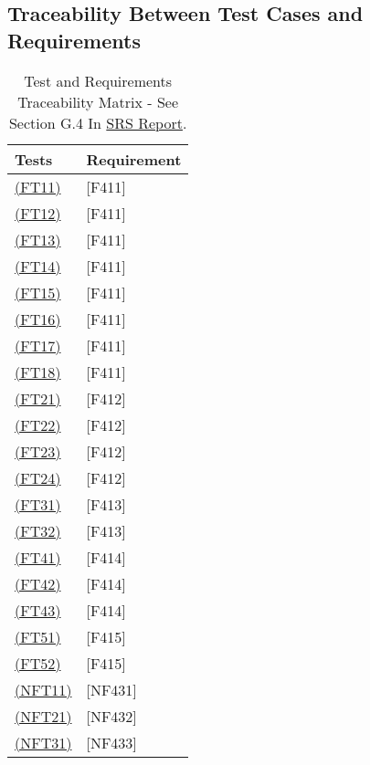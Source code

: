 \documentclass[12pt, titlepage]{article}
\begin{document}
\subsection{Traceability Between Test Cases and Requirements}

\begin{table}[H]
  
  \centering
  \caption{Test and Requirements Traceability Matrix - See Section G.4 In \href{https://github.com/takhtart/PCD/blob/main/docs/SRS/SRS.pdf}{SRS Report}.}
  \begin{tabular}{|l|l|}
  \hline
  Tests   & Requirement \\
  \hline
  \hyperref[FT11]{(FT11)}  & {[}F411{]}  \\
  \hline
  \hyperref[FT12]{(FT12)}  & {[}F411{]}  \\
  \hline
  \hyperref[FT13]{(FT13)}  & {[}F411{]}  \\
  \hline
  \hyperref[FT14]{(FT14)} & {[}F411{]}  \\
  \hline
  \hyperref[FT15]{(FT15)}  & {[}F411{]}  \\
  \hline
  \hyperref[FT16]{(FT16)}  & {[}F411{]}  \\
  \hline
  \hyperref[FT17]{(FT17)}  & {[}F411{]}  \\
  \hline
  \hyperref[FT18]{(FT18)}  & {[}F411{]}  \\
  \hline
  \hyperref[FT21]{(FT21)}  & {[}F412{]}  \\
  \hline
  \hyperref[FT22]{(FT22)}  & {[}F412{]}  \\
  \hline
  \hyperref[FT23]{(FT23)}  & {[}F412{]}  \\
  \hline
  \hyperref[FT24]{(FT24)}  & {[}F412{]}  \\
  \hline
  \hyperref[FT31]{(FT31)}  & {[}F413{]}  \\
  \hline
  \hyperref[FT32]{(FT32)}  & {[}F413{]}  \\
  \hline
  \hyperref[FT41]{(FT41)}  & {[}F414{]}  \\
  \hline
  \hyperref[FT42]{(FT42)}  & {[}F414{]}  \\
  \hline
  \hyperref[FT43]{(FT43)}  & {[}F414{]}  \\
  \hline
  \hyperref[FT51]{(FT51)}  & {[}F415{]}  \\
  \hline
  \hyperref[FT52]{(FT52)}  & {[}F415{]}  \\
  \hline
  \hyperref[NFT11]{(NFT11)} & {[}NF431{]} \\
  \hline
  \hyperref[NFT21]{(NFT21)} & {[}NF432{]} \\
  \hline
  \hyperref[NFT31]{(NFT31)} & {[}NF433{]} \\ 
  \hline
  \end{tabular}
  \end{table}
\end{document}
